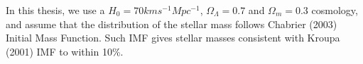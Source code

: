 
In this thesis, we use a $H_{0}=70 km s^{-1}Mpc^{-1}$, $\Omega_{\Lambda}=0.7$ and $\Omega_{m}=0.3$ cosmology, and assume that the distribution of the stellar mass follows Chabrier (2003) Initial Mass Function. Such IMF gives stellar masses consistent with Kroupa (2001) IMF to within 10\%.  